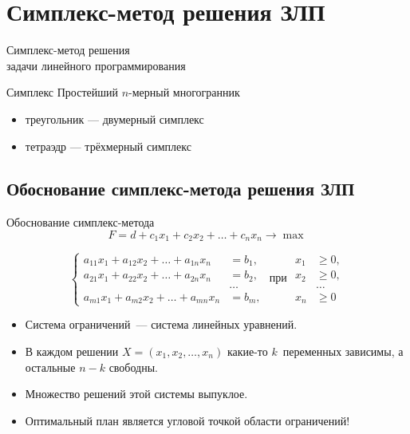 \documentclass[unicode,11pt,notheorems]{beamer}
\begin{document}
\section{Симплекс-метод решения ЗЛП}
\begin{frame}[t]{}{}
\vspace{2cm}
{\LARGE	Симплекс-метод решения\\ задачи линейного программирования\par}
\vspace{\fill}

\begin{alertblock}{Симплекс}
Простейший $n$-мерный многогранник

\begin{itemize}  
\item треугольник --- двумерный симплекс
\item тетраэдр  --- трёхмерный симплекс
\end{itemize}
\end{alertblock}
\end{frame}   

\subsection{Обоснование симплекс-метода решения ЗЛП}
\begin{frame}{Обоснование симплекс-метода}{}
  $$
  F=d+c_1x_1+c_2x_2+\ldots+c_n x_n \to \max
  $$
  
  $$
  \left\lbrace
  \begin{aligned}
  a_{11} x_1 + a_{12} x_2 + \ldots + a_{1n} x_n &= b_1,\\
  a_{21} x_1 + a_{22} x_2 + \ldots + a_{2n} x_n &=  b_2,\\
  &\ldots\\
  a_{m1} x_1 + a_{m2} x_2 + \ldots + a_{mn} x_n &=  b_m,
  \end{aligned}
  \right. \text{ при }
  \begin{aligned}
  x_1 &\geqslant 0,\\
  x_2 &\geqslant 0,\\
  &\ldots\\
  x_n &\geqslant 0
  \end{aligned}
  $$

\begin{itemize}  
	\item Система ограничений~--- система линейных уравнений.
	\item В каждом решении $X=(x_1,x_2,\ldots,x_n)$  какие-то $k$~переменных зависимы, а остальные $n-k$ свободны.
	\item Множество решений  этой системы выпуклое.
	\item Оптимальный план является угловой точкой области ограничений!
\end{itemize}
\end{frame}   
\end{document}
